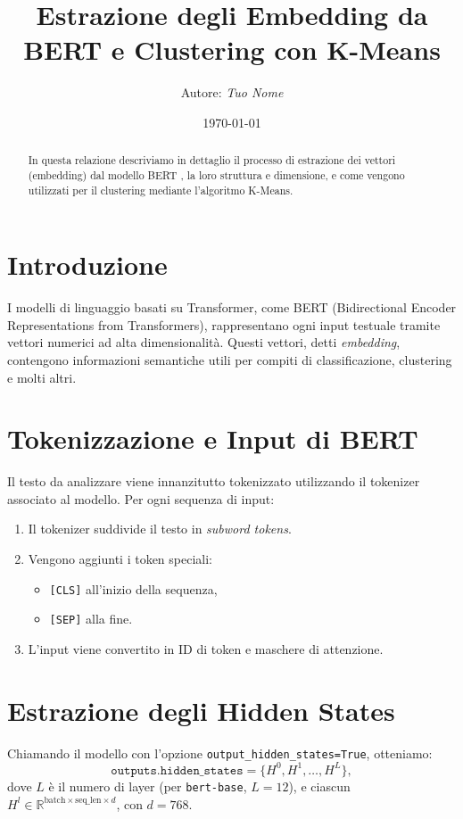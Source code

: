 \documentclass[a4paper,11pt]{article}
\title{Estrazione degli Embedding da BERT e Clustering con K-Means}
\author{Autore: \textit{Tuo Nome}}
\date{\today}
\begin{document}
\maketitle

\begin{abstract}
In questa relazione descriviamo in dettaglio il processo di estrazione dei vettori (embedding) dal modello BERT \texttt{}, la loro struttura e dimensione, e come vengono utilizzati per il clustering mediante l'algoritmo K-Means. 
\end{abstract}

\section{Introduzione}
I modelli di linguaggio basati su Transformer, come BERT (Bidirectional Encoder Representations from Transformers), rappresentano ogni input testuale tramite vettori numerici ad alta dimensionalità. Questi vettori, detti \emph{embedding}, contengono informazioni semantiche utili per compiti di classificazione, clustering e molti altri.

\section{Tokenizzazione e Input di BERT}
Il testo da analizzare viene innanzitutto tokenizzato utilizzando il tokenizer associato al modello. Per ogni sequenza di input:
\begin{enumerate}
  \item Il tokenizer suddivide il testo in \emph{subword tokens}. 
  \item Vengono aggiunti i token speciali:
    \begin{itemize}
      \item \texttt{[CLS]} all'inizio della sequenza,
      \item \texttt{[SEP]} alla fine.
    \end{itemize}
  \item L'input viene convertito in ID di token e maschere di attenzione.
\end{enumerate}

\section{Estrazione degli Hidden States}
Chiamando il modello con l'opzione \texttt{output\_hidden\_states=True}, otteniamo:
\[
\texttt{outputs.hidden\_states} = \{H^0, H^1, \dots, H^L\},
\]
dove \( L \) è il numero di layer (per \texttt{bert-base}, \( L = 12 \)), e ciascun \( H^l \in \mathbb{R}^{\mathrm{batch} \times \mathrm{seq\_len} \times d} \), con \( d = 768 \).
\end{document}
